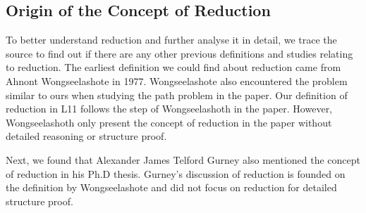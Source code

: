 \documentclass[a4paper,12pt,twoside,openright]{report}
\begin{document}
\subsection{Origin of the Concept of Reduction}
To better understand reduction and further analyse it in detail, we trace the source to find out if there are any other previous definitions and studies relating to reduction. 
The earliest definition we could find about reduction came from Ahnont Wongseelashote in 1977\cite{WONGSEELASHOTE197955}. Wongseelashote also encountered the problem similar to ours when studying the path problem in the paper. Our definition of reduction in L11 follows the step of Wongseelashoth in the paper. However, Wongseelashoth only present the concept of reduction in the paper without detailed reasoning or structure proof.

Next, we found that Alexander James Telford Gurney also mentioned the concept of reduction in his Ph.D thesis\cite{gurney_construction_2010}. Gurney's discussion of reduction is founded on the definition by Wongseelashote and did not focus on reduction for detailed structure proof.
\end{document}
